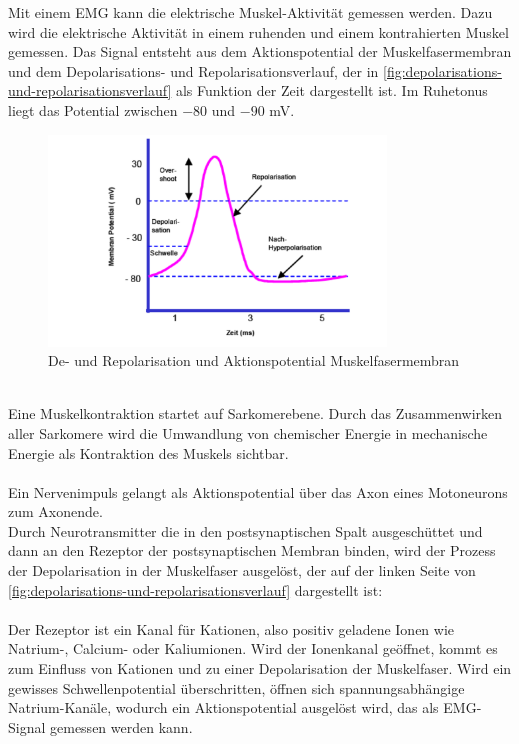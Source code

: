 Mit einem EMG kann die elektrische Muskel-Aktivität gemessen werden.
Dazu wird die elektrische Aktivität in einem ruhenden und einem kontrahierten Muskel gemessen. Das Signal entsteht aus dem Aktionspotential der Muskelfasermembran und dem Depolarisations- und Repolarisationsverlauf, der in \autoref{fig:depolarisations-und-repolarisationsverlauf} als Funktion der Zeit dargestellt ist. Im Ruhetonus liegt das Potential zwischen $-80$ und  $-90$ mV.
\begin{figure}[h!]
    \centering
    \includegraphics[width=0.8\textwidth]{img/De-Repolarisation.PNG}
    \caption{De- und Repolarisation und Aktionspotential Muskelfasermembran \cite{Vorlesung-Muskulatur-EMG}}
    \label{fig:depolarisations-und-repolarisationsverlauf}
\end{figure}
\\
Eine Muskelkontraktion startet auf Sarkomerebene.
Durch das Zusammenwirken aller Sarkomere wird die Umwandlung von chemischer Energie in mechanische Energie als Kontraktion des Muskels sichtbar.
\\
\\
Ein  Nervenimpuls gelangt als Aktionspotential über das Axon eines Motoneurons zum Axonende. \\
Durch Neurotransmitter die in den postsynaptischen Spalt ausgeschüttet und dann an den Rezeptor der postsynaptischen Membran binden, wird der Prozess der Depolarisation in der Muskelfaser ausgelöst, der auf der linken Seite von  \autoref{fig:depolarisations-und-repolarisationsverlauf} dargestellt ist:\\
\\
Der Rezeptor ist ein Kanal für Kationen, also positiv geladene Ionen wie Natrium-, Calcium- oder Kaliumionen. Wird der Ionenkanal geöffnet, kommt es zum Einfluss von Kationen und zu einer  Depolarisation der Muskelfaser. Wird ein gewisses Schwellenpotential überschritten, öffnen sich spannungsabhängige Natrium-Kanäle, wodurch ein Aktionspotential ausgelöst wird, das als EMG-Signal gemessen werden kann.
